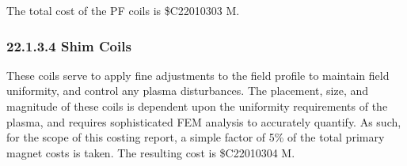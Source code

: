 The total cost of the PF coils is \$C22010303 M. \\

\subsubsection*{22.1.3.4 Shim Coils}

These coils serve to apply fine adjustments to the field profile to maintain field uniformity, and control any plasma disturbances. The placement, size, and magnitude of these coils is dependent upon the uniformity requirements of the plasma, and requires sophisticated FEM analysis to accurately quantify. As such, for the scope of this costing report, a simple factor of 5\% of the total primary magnet costs is taken. The resulting cost is \$C22010304 M.\\


